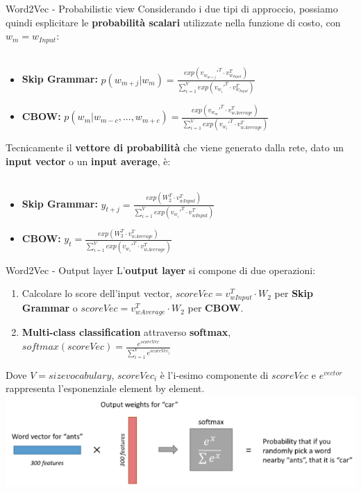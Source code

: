 \documentclass[british]{beamer}
\begin{document}
\begin{frame}{Word2Vec - Probabilistic view}
	Considerando i due tipi di approccio, possiamo quindi esplicitare le \textbf{probabilit\`{a} scalari} utilizzate nella funzione di costo, con \(w_{m} = w_{Input}\):
	\\~\\
	\begin{itemize}
		\item \textbf{Skip Grammar: }
		\(p(w_{m+j}|w_{m}) = \frac{exp(v_{w_{m+j}}'^T \cdot v_{w_{Input}}^T)}{\sum_{i=1}^{V}exp(v_{w_i}'^T \cdot v_{w_{Input}}^T)}\)
		\item \textbf{CBOW: }
		\(p(w_{m}|w_{m-c}, ... , w_{m+c}) = \frac{exp(v_{w_{m}}'^T \cdot v_{wAverage}^T)}{\sum_{i=1}^{V}exp(v_{w_i}'^T \cdot v_{wAverage}^T)}\)
	\end{itemize}
	Tecnicamente il \textbf{vettore di probabilit\`{a}} che viene generato dalla rete, dato un \textbf{input vector} o un \textbf{input average}, \`{e}:
	\\~\\
	\begin{itemize}
		\item \textbf{Skip Grammar: }
		\(y_{t+j} = \frac{exp(W_2^T \cdot v_{wInput}^T)}{\sum_{i=1}^{V}exp(v_{w_i}'^T \cdot v_{wInput}^T)}\)
		\item \textbf{CBOW: }
		\(y_t = \frac{exp(W_2^T \cdot v_{wAverage}^T)}{\sum_{i=1}^{V}exp(v_{w_i}'^T \cdot v_{wAverage}^T)}\)
	\end{itemize}
\end{frame}

\begin{frame}{Word2Vec - Output layer}
	L'\textbf{output layer} si compone di due operazioni:
	\begin{enumerate}
		\item Calcolare lo score dell'input vector, \(scoreVec = v_{wInput}^T \cdot W_2\) per \textbf{Skip Grammar} o \(scoreVec = v_{wAverage}^T \cdot W_2\) per \textbf{CBOW}.
		\item \textbf{Multi-class classification} attraverso \textbf{softmax}, \(softmax(scoreVec) = \frac{e^{scoreVec}}{\sum_{i=1}^{V}e^{scoreVec_i}}\)
	\end{enumerate}
	Dove \(V = sizevocabulary\), \(scoreVec_i\) \`{e} l'i-esimo componente di \(scoreVec\) e \(e^{vector}\) rappresenta l'esponenziale element by element.
	\includegraphics[width=0.9\linewidth,height=0.25\textwidth]{./Imgs/output_layer}
\end{frame}
\end{document}
